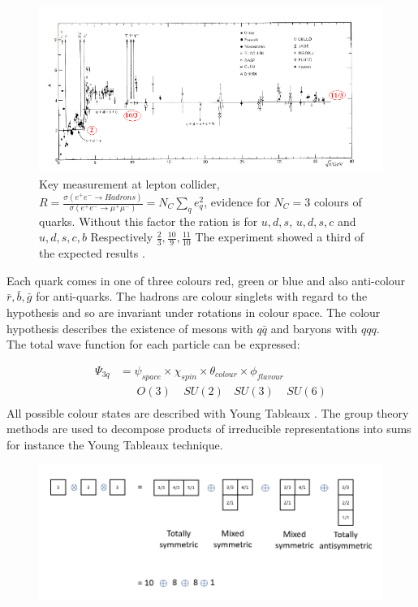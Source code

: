 \begin{figure}[h!]
\includegraphics[width=1.1\textwidth, left]{images/Intro/Ratio.png}
\caption{Key measurement at lepton collider, $R = \frac{\sigma(e^+e^- \rightarrow Hadrons)}{\sigma(e^+e^- \rightarrow \mu^+ \mu^-)} =N_C \sum_q e^2_q$, evidence for $N_C=3$ colours of quarks. Without this factor the ration is for $ u, d, s $, $ u, d, s, c $ and $ u, d, s, c, b $ Respectively $ \frac{2}{3}, \frac{10}{9}, \frac{11}{10} $ The experiment showed a third of the expected results \cite{Eva}.}
\label{ratio}
\end{figure}


Each quark comes in one of three colours red, green or blue and also anti-colour $ \bar{r}, \bar{b}, \bar{g} $  for anti-quarks. The hadrons are colour singlets with regard to the hypothesis and so are invariant under rotations in colour space. The colour hypothesis describes the existence of mesons with $ q \bar{q} $ and baryons with $ qqq $. \\
The total wave function for each particle can be expressed:

\begin{equation}
\begin{split}
\Psi_{3q} &= \psi_{space} \times \chi_{spin} \times \theta_{colour} \times \phi_{flavour} \\
&\:\:\:\:\:\:\:O(3) \:\:\:\:\: SU(2)\:\:\:\: SU(3)\:\:\:\:\: SU(6)\\
\end{split}
\end{equation}
All possible colour states are described with Young Tableaux \cite{Greiner1989}. The group theory methods are used to decompose products of irreducible representations into sums for instance the Young Tableaux technique.
\begin{figure}[h!]
\centering
\includegraphics[scale=0.7]{images/Intro/Young.png}
\end{figure}

